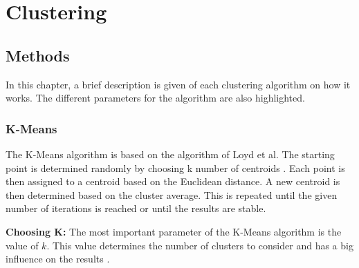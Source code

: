 \section{Clustering}
\subsection{Methods}
In this chapter, a brief description is given of each clustering algorithm on how it works. The different parameters for the algorithm are also highlighted.
\subsubsection{K-Means} \label{theory:kmeans}
The K-Means algorithm is based on the algorithm of Loyd et al.
The starting point is determined randomly by choosing k number of centroids \citep{1056489}.
Each point is then assigned to a centroid based on the Euclidean distance.
A new centroid is then determined based on the cluster average.
This is repeated until the given number of iterations is reached or until the results are stable.

\textbf{Choosing K:} The most important parameter of the K-Means algorithm is the value of $k$.
This value determines the number of clusters to consider and has a big influence on the results \citep{ahmed_k-means_2020}.

